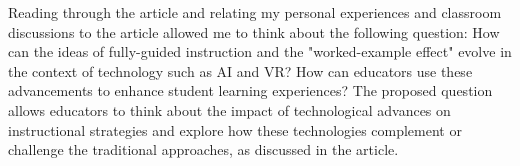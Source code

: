 \documentclass[11pt]{article}
\begin{document}
Reading through the article and relating my personal experiences and classroom discussions to the article allowed me to think about the following question: How can the ideas of fully-guided instruction and the "worked-example effect" evolve in the context of technology such as AI and VR? How can educators use these advancements to enhance student learning experiences? The proposed question allows educators to think about the impact of technological advances on instructional strategies and explore how these technologies complement or challenge the traditional approaches, as discussed in the article.

\cite{article:2}



\end{document}
